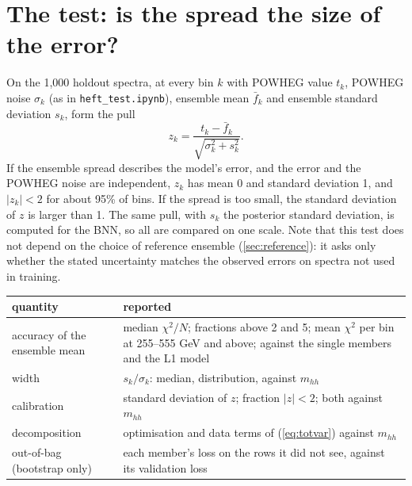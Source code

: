 \documentclass[11pt]{article}
\newcommand{\file}[1]{\nolinkurl{#1}}
\newcommand{\mhh}{m_{hh}}
\begin{document}
\section{The test: is the spread the size of the error?}
\label{sec:test}

On the 1,000 holdout spectra, at every bin $k$ with POWHEG value $t_k$, POWHEG noise
$\sigma_k$ (as in \file{heft_test.ipynb}), ensemble mean $\bar f_k$ and ensemble standard
deviation $s_k$, form the pull
\begin{equation}
  z_k = \frac{t_k - \bar f_k}{\sqrt{\sigma_k^2 + s_k^2}} .
  \label{eq:pull}
\end{equation}
If the ensemble spread describes the model's error, and the error and the POWHEG noise
are independent, $z_k$ has mean 0 and standard deviation 1, and $|z_k| < 2$ for about
95\% of bins. If the spread is too small, the standard deviation of $z$ is larger than 1.
The same pull, with $s_k$ the posterior standard deviation, is computed for the BNN, so all
are compared on one scale. Note that this test does not depend on the choice of reference
ensemble (\cref{sec:reference}): it asks only whether the stated uncertainty matches the
observed errors on spectra not used in training.

\begin{center}
\small
\begin{tabular}{p{}p{}}
\toprule
quantity & reported\\
\midrule
accuracy of the ensemble mean & median $\chi^2/N$; fractions above 2 and 5; mean $\chi^2$
  per bin at 255--555 GeV and above; against the single members and the L1 model\\
width & $s_k/\sigma_k$: median, distribution, against $\mhh$\\
calibration & standard deviation of $z$; fraction $|z| < 2$; both against $\mhh$\\
decomposition & optimisation and data terms of (\ref{eq:totvar}) against $\mhh$\\
out-of-bag (bootstrap only) & each member's loss on the rows it did not see, against its
  validation loss\\
\bottomrule
\end{tabular}
\end{center}
\end{document}
